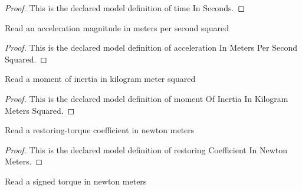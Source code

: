 \begin{proof}
  This is the declared model definition of time In Seconds.
\end{proof}
\begin{definition}
  \label{def:physics:phyx-mini-0229:phyxminiproblems-problemphyxmini0229-accelerationinmeterspersecondsquared}
  Read an acceleration magnitude in meters per second squared
\end{definition}
\begin{proof}
  This is the declared model definition of acceleration In Meters Per Second Squared.
\end{proof}
\begin{definition}
  \label{def:physics:phyx-mini-0229:phyxminiproblems-problemphyxmini0229-momentofinertiainkilogrammeterssquared}
  Read a moment of inertia in kilogram meter squared
\end{definition}
\begin{proof}
  This is the declared model definition of moment Of Inertia In Kilogram Meters Squared.
\end{proof}
\begin{definition}
  \label{def:physics:phyx-mini-0229:phyxminiproblems-problemphyxmini0229-restoringcoefficientinnewtonmeters}
  Read a restoring-torque coefficient in newton meters
\end{definition}
\begin{proof}
  This is the declared model definition of restoring Coefficient In Newton Meters.
\end{proof}
\begin{definition}
  \label{def:physics:phyx-mini-0229:phyxminiproblems-problemphyxmini0229-torqueinnewtonmeters}
  Read a signed torque in newton meters
\end{definition}
